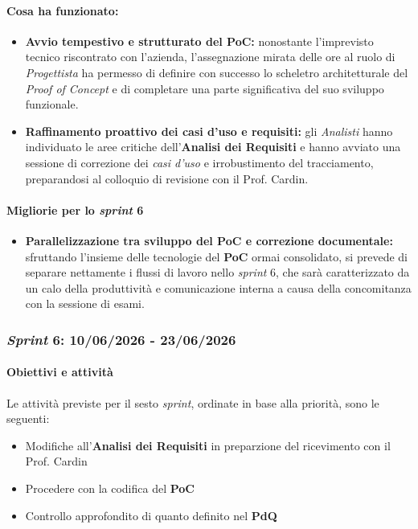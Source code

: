 \documentclass[12pt, a4paper]{article}
\begin{document}
{\paragraph{Cosa ha funzionato:}
\begin{itemize}
    \item \textbf{Avvio tempestivo e strutturato del \textbf{PoC}:} nonostante l'imprevisto tecnico riscontrato con l'azienda, l'assegnazione mirata delle ore al ruolo di \textit{Progettista} ha permesso di definire con successo lo scheletro architetturale del \textit{Proof of Concept} e di completare una parte significativa del suo sviluppo funzionale.
    \item \textbf{Raffinamento proattivo dei casi d'uso e requisiti:} gli \textit{Analisti} hanno individuato le aree critiche dell'\textbf{Analisi dei Requisiti} e hanno avviato una sessione di correzione dei \textit{casi d'uso} e irrobustimento del tracciamento, preparandosi al colloquio di revisione con il Prof. Cardin.
\end{itemize}

\paragraph{Migliorie per lo \textit{sprint} 6}
\begin{itemize}
    \item \textbf{Parallelizzazione tra sviluppo del PoC e correzione documentale:} sfruttando l'insieme delle tecnologie del \textbf{PoC} ormai consolidato, si prevede di separare nettamente i flussi di lavoro nello \textit{sprint} 6, che sarà caratterizzato da un calo della produttività e comunicazione interna a causa della concomitanza con la sessione di esami.
\end{itemize}

\subsubsection{\textit{Sprint} 6: 10/06/2026 - 23/06/2026}

\paragraph{Obiettivi e attività}

Le attività previste per il sesto \textit{sprint}, ordinate in base alla priorità, sono le seguenti:

\begin{itemize}
    \item  Modifiche all'\textbf{Analisi dei Requisiti} in preparzione del ricevimento con il Prof. Cardin
    \item Procedere con la codifica del \textbf{PoC}
    \item Controllo approfondito di quanto definito nel \textbf{PdQ}
\end{itemize}

}
\end{document}
